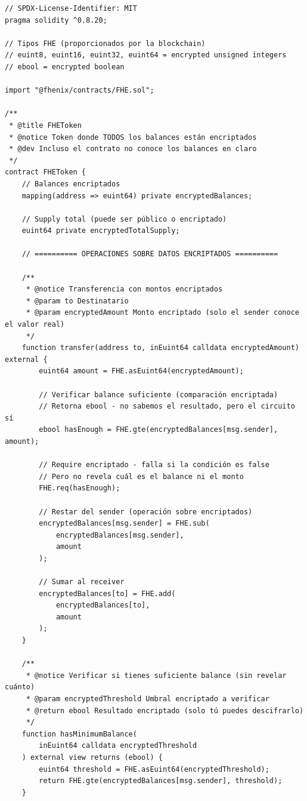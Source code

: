 \documentclass[11pt,a4paper,twoside]{book}
\theoremstyle{definition}
\theoremstyle{remark}
\begin{document}
\begin{lstlisting}[language=Solidity, caption={Conceptual: Smart contract con FHE (estilo Fhenix)}]
// SPDX-License-Identifier: MIT
pragma solidity ^0.8.20;

// Tipos FHE (proporcionados por la blockchain)
// euint8, euint16, euint32, euint64 = encrypted unsigned integers
// ebool = encrypted boolean

import "@fhenix/contracts/FHE.sol";

/**
 * @title FHEToken
 * @notice Token donde TODOS los balances están encriptados
 * @dev Incluso el contrato no conoce los balances en claro
 */
contract FHEToken {
    // Balances encriptados
    mapping(address => euint64) private encryptedBalances;
    
    // Supply total (puede ser público o encriptado)
    euint64 private encryptedTotalSupply;
    
    // ========== OPERACIONES SOBRE DATOS ENCRIPTADOS ==========
    
    /**
     * @notice Transferencia con montos encriptados
     * @param to Destinatario
     * @param encryptedAmount Monto encriptado (solo el sender conoce el valor real)
     */
    function transfer(address to, inEuint64 calldata encryptedAmount) external {
        euint64 amount = FHE.asEuint64(encryptedAmount);
        
        // Verificar balance suficiente (comparación encriptada)
        // Retorna ebool - no sabemos el resultado, pero el circuito sí
        ebool hasEnough = FHE.gte(encryptedBalances[msg.sender], amount);
        
        // Require encriptado - falla si la condición es false
        // Pero no revela cuál es el balance ni el monto
        FHE.req(hasEnough);
        
        // Restar del sender (operación sobre encriptados)
        encryptedBalances[msg.sender] = FHE.sub(
            encryptedBalances[msg.sender],
            amount
        );
        
        // Sumar al receiver
        encryptedBalances[to] = FHE.add(
            encryptedBalances[to],
            amount
        );
    }
    
    /**
     * @notice Verificar si tienes suficiente balance (sin revelar cuánto)
     * @param encryptedThreshold Umbral encriptado a verificar
     * @return ebool Resultado encriptado (solo tú puedes descifrarlo)
     */
    function hasMinimumBalance(
        inEuint64 calldata encryptedThreshold
    ) external view returns (ebool) {
        euint64 threshold = FHE.asEuint64(encryptedThreshold);
        return FHE.gte(encryptedBalances[msg.sender], threshold);
    }
    

\end{lstlisting}
\end{document}
